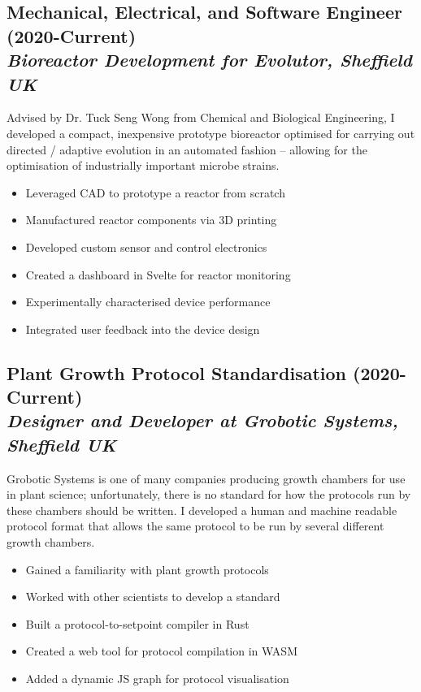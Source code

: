\documentclass[twocolumn, a4paper, fontsize=9pt, headsepline, footsepline]{scrartcl}
\begin{document}
\subsection*{Mechanical, Electrical, and Software Engineer
  (2020-Current)\\\textmd{\emph{Bioreactor Development for Evolutor, Sheffield UK}}}
\noindent
Advised by Dr. Tuck Seng Wong from Chemical and Biological Engineering, I
developed a compact, inexpensive prototype bioreactor optimised for carrying out
directed / adaptive evolution in an automated fashion – allowing for the
optimisation of industrially important microbe strains.
\begin{itemize}
\item Leveraged CAD to prototype a reactor from scratch
\item Manufactured reactor components via 3D printing
\item Developed custom sensor and control electronics
\item Created a dashboard in Svelte for reactor monitoring
\item Experimentally characterised device performance
\item Integrated user feedback into the device design
\end{itemize}

\subsection*{Plant Growth Protocol Standardisation
  (2020-Current)\\\textmd{\emph{Designer and Developer at Grobotic Systems, Sheffield UK}}}
\noindent
Grobotic Systems is one of many companies producing growth chambers for use in
plant science; unfortunately, there is no standard for how the protocols run by
these chambers should be written. I developed a human and machine readable
protocol format that allows the same protocol to be run by several different
growth chambers.
\begin{itemize}
\item Gained a familiarity with plant growth protocols
\item Worked with other scientists to develop a standard
\item Built a protocol-to-setpoint compiler in Rust
\item Created a web tool for protocol compilation in WASM
\item Added a dynamic JS graph for protocol visualisation
\end{itemize}
\end{document}
